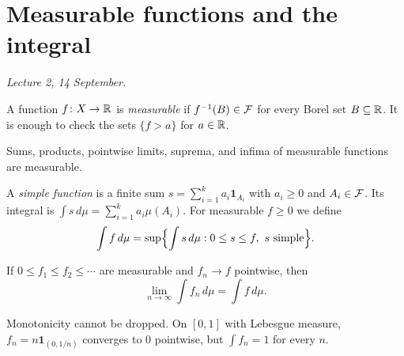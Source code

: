 \section{Measurable functions and the integral}

\emph{Lecture 2, 14 September.}

\begin{definition}
A function $f \colon X \to \mathbb{R}$ is \emph{measurable} if $f^{-1}(B) \in \mathcal{F}$ for every Borel set $B \subseteq \mathbb{R}$. It is enough to check the sets $\{ f > a \}$ for $a \in \mathbb{R}$.
\end{definition}

Sums, products, pointwise limits, suprema, and infima of measurable functions are measurable.

\begin{definition}
A \emph{simple function} is a finite sum $s = \sum_{i=1}^k a_i \mathbf{1}_{A_i}$ with $a_i \ge 0$ and $A_i \in \mathcal{F}$. Its integral is $\int s \, d\mu = \sum_{i=1}^k a_i \mu(A_i)$. For measurable $f \ge 0$ we define
\[
  \int f \, d\mu = \sup \Bigl\{ \int s \, d\mu : 0 \le s \le f, \ s \text{ simple} \Bigr\}.
\]
\end{definition}

\begin{theorem}
\label{thm:mct}
If $0 \le f_1 \le f_2 \le \cdots$ are measurable and $f_n \to f$ pointwise, then
\[
  \lim_{n \to \infty} \int f_n \, d\mu = \int f \, d\mu .
\]
\end{theorem}

\begin{remark}
Monotonicity cannot be dropped. On $[0, 1]$ with Lebesgue measure, $f_n = n \mathbf{1}_{(0, 1/n)}$ converges to $0$ pointwise, but $\int f_n = 1$ for every $n$.
\end{remark}
